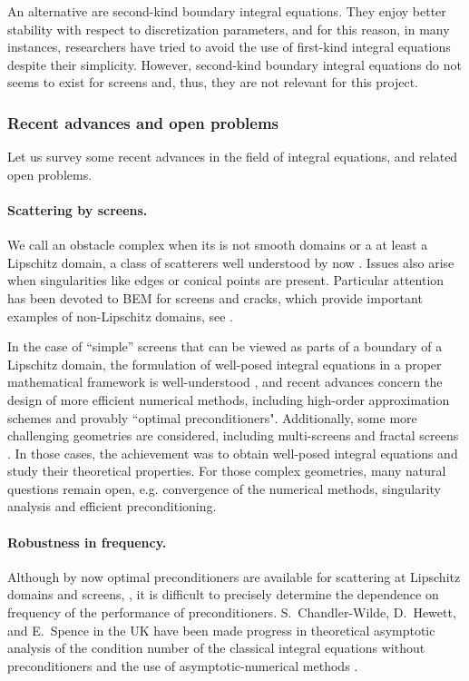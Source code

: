\documentclass[]{report}
\begin{document}
An alternative are second-kind boundary integral equations. They enjoy better stability with
respect to discretization parameters, and for this reason, in many instances, researchers
have tried to avoid the use of first-kind integral equations despite their
simplicity. However, second-kind boundary integral equations do not seems to exist for
screens and, thus, they are not relevant for this project. 

\subsubsection*{Recent advances and open problems}

Let us survey some recent advances in the field of integral equations, and related open problems.

\paragraph{Scattering by screens.} We call an obstacle complex when its is not smooth
domains or a at least a Lipschitz domain, a class of scatterers well understood by now
\cite{mclean2000strongly}. Issues also arise when singularities like edges or conical
points are present. Particular attention has been devoted to BEM for screens and cracks,
which provide important examples of non-Lipschitz domains, see
\cite{bruno2013high,gimperlein2019optimal,hiptmair2018closed,hiptmair2019preconditioning,hiptmair2020optimal,hiptmair2020compact,ramaciotti2017some}.

In the case of ``simple'' screens that can be viewed as parts of a boundary of a Lipschitz
domain, the formulation of well-posed integral equations in a proper mathematical
framework is well-understood \cite{stephan1984augmented,wendland1990hypersingular}, and
recent advances concern the design of more efficient numerical methods, including
high-order approximation schemes and provably ``optimal preconditioners". Additionally,
some more challenging geometries are considered, including multi-screens
\cite{claeys2013integral,claeys2020quotient} and fractal screens
\cite{chandlerWilde2017sobolev}. In those cases, the achievement was to obtain well-posed
integral equations and study their theoretical properties. For those complex geometries,
many natural questions remain open, e.g. convergence of the numerical methods, singularity
analysis and efficient preconditioning.

\paragraph{Robustness in frequency.} Although by now optimal preconditioners are available
for scattering at Lipschitz domains and screens,
\cite{steinbach1998construction,hiptmair2006operator}, it is difficult to precisely
determine the dependence on frequency of the performance of
preconditioners. S.~Chandler-Wilde, D.~Hewett, and E.~Spence in the UK have been made
progress in theoretical asymptotic analysis of the condition number of the classical integral equations without
preconditioners \cite{chandler2020high} and the use of asymptotic-numerical methods
\cite{chandlerWilde2015high}.
\end{document}
